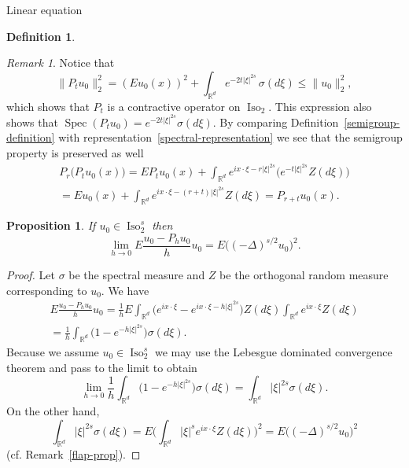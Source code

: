 \documentclass[a4paper,10pt,fleqn]{amsart}
\newtheorem{proposition}[theorem]{Proposition}
\theoremstyle{remark}
\newtheorem{remark}[theorem]{Remark}
\theoremstyle{definition}
\newtheorem{definition}[theorem]{Definition}
\DeclareMathOperator{\Iso}{Iso}
\DeclareMathOperator{\Spec}{Spec}
\newcommand{\X} {{\mathbb{R}^d}}
\renewcommand{\=} {\overset{d}{=}}
\begin{document}
\begin{section}{Linear equation}
\begin{definition}
\begin{equation*}
         \end{equation*}
         \end{definition}
         \begin{remark}
         Notice that 
         \begin{equation*}
             \|P_tu_0\|_2^2 = (Eu_0(x))^2+\int_\X e^{-2t|\xi|^{2s}}\,\sigma(d\xi) \leq \|u_0\|_2^2,
         \end{equation*}
         which shows that $P_t$ is a contractive operator on $\Iso_2$. This expression also shows that
         $\Spec(P_tu_0)=e^{-2t|\xi|^{2s}}\sigma(d\xi)$. By comparing Definition~\ref{semigroup-definition} with representation~\eqref{spectral-representation} we see that the semigroup property is preserved as well
         \begin{multline*}
          P_r\big(P_tu_0(x)\big) = EP_tu_0(x)+\int_\X e^{ix\cdot\xi-r|\xi|^{2s}}\big(e^{-t|\xi|^{2s}}Z(d\xi)\big)\\
          = Eu_0(x)+\int_\X e^{ix\cdot\xi-(r+t)|\xi|^{2s}}Z(d\xi) = P_{r+t}u_0(x).
         \end{multline*}
         \end{remark}
         \begin{proposition}\label{semigroup-limit}
          If $u_0\in\Iso^s_2$ then 
          \begin{equation*}
           \lim_{h\to0} E\frac{u_0-P_hu_0}{h}u_0 = E\big((-\Delta)^{s/2}u_0\big)^2.
          \end{equation*}
         \end{proposition}
         \begin{proof}
           Let $\sigma$ be the spectral measure and $Z$ be the orthogonal random measure corresponding to $u_0$. We have
	   \begin{multline*}
             E\frac{u_0-P_hu_0}{h}u_0 
	     =\frac{1}{h}E\int_\X\big(e^{ix\cdot\xi}-e^{ix\cdot\xi-h|\xi|^{2s}}\big)Z(d\xi)\int_\X e^{ix\cdot\xi}Z(d\xi)\\
             = \frac{1}{h}\int_\X \big(1-e^{-h|\xi|^{2s}}\big)\sigma(d\xi).
           \end{multline*}
           Because we assume $u_0\in\Iso^s_2$ we may use the Lebesgue dominated convergence theorem and pass to the limit to obtain
           \begin{equation*}
           \lim_{h\to0}\frac{1}{h}\int_\X \big(1-e^{-h|\xi|^{2s}}\big)\sigma(d\xi) = \int_\X |\xi|^{2s}\sigma(d\xi).
           \end{equation*}
           On the other hand,
           \begin{equation*}
             \int_\X |\xi|^{2s}\sigma(d\xi) 
             = E\Big(\int_\X |\xi|^s e^{ix\cdot\xi}Z(d\xi)\Big)^2 = E\big((-\Delta)^{s/2}u_0\big)^2
           \end{equation*}
           (cf. Remark~\ref{flap-prop}).
         \end{proof}


\end{section}
\end{document}
